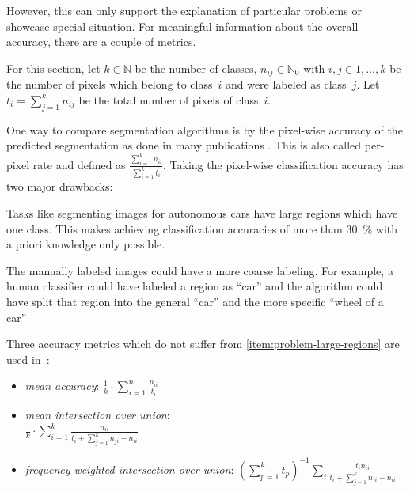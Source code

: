 However, this can only support the explanation of particular problems or
showcase special situation. For meaningful information about the overall
accuracy, there are a couple of metrics.

For this section, let $k \in \mathbb{N}$ be the number of classes, $n_{ij} \in
\mathbb{N}_0$ with $i,j \in 1, \dots, k$ be the number of pixels which belong to
class~$i$ and were labeled as class~$j$. Let $t_i = \sum_{j=1}^k n_{ij}$ be the
total number of pixels of class~$i$.

One way to compare segmentation algorithms is by the pixel-wise accuracy of the
predicted segmentation as done in many publications
\cite{shotton2006textonboost,csurka2008simple,long2014fully}. This is also
called per-pixel rate and defined as $\frac{\sum_{i=1}^k n_{ii}}{\sum_{i=1}^k
t_i}$. Taking the pixel-wise classification accuracy has two major drawbacks:

\begin{problemnr}
    \item \label{item:problem-large-regions} Tasks like segmenting images for
          autonomous cars have large regions which have one class. This makes
          achieving classification accuracies of more than \SI{30}{\percent}
          with a priori knowledge only possible.
    \item \label{item:problem-labeling-granularity} The manually labeled images
          could have a more coarse labeling. For example, a human classifier
          could have labeled a region as
          \enquote{car} and the algorithm could have split that region into
          the general \enquote{car} and the more specific \enquote{wheel of a
          car}
\end{problemnr}
\goodbreak
Three accuracy metrics which do not suffer from
\cref{item:problem-large-regions} are used in~\cite{long2014fully}:\nobreak%
\begin{itemize}
    \item \textit{mean accuracy}: $\frac{1}{k} \cdot \sum_{i=1}^n \frac{n_{ii}}{t_i}$
    \item \textit{mean intersection over union}: \hfill\\$\frac{1}{k} \cdot \sum_{i=1}^k \frac{n_{ii}}{t_i + \sum_{j=1}^k n_{ji}-n_{ii}}$
    \item \textit{frequency weighted intersection over union}:
          ${({\sum_{p=1}^k t_p})}^{-1} \sum_i \frac{t_i n_{ii}}{t_i + \sum_{j=1}^k n_{ji} - n_{ii}}$
\end{itemize}

